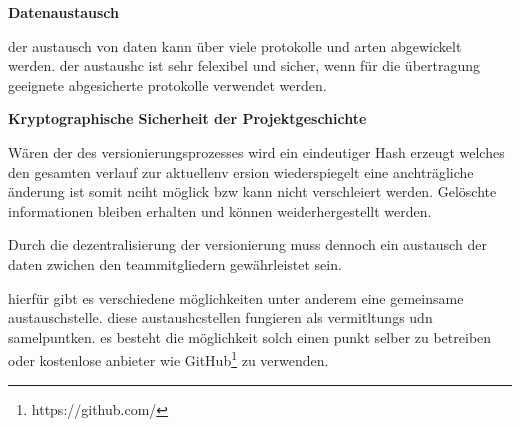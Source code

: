 \textbf{Datenaustausch}

der austausch von daten kann über viele protokolle und arten abgewickelt werden. der austaushc ist sehr felexibel und sicher, wenn für die übertragung geeignete abgesicherte protokolle verwendet werden.


\textbf{Kryptographische Sicherheit der Projektgeschichte}

Wären der des versionierungsprozesses wird ein eindeutiger Hash erzeugt welches den gesamten verlauf zur aktuellenv ersion wiederspiegelt eine anchträgliche änderung ist somit nciht möglick bzw kann nicht verschleiert werden. Gelöschte informationen bleiben erhalten und können weiderhergestellt werden.

Durch die dezentralisierung der versionierung muss dennoch ein austausch der daten zwichen den teammitgliedern gewährleistet sein.

hierfür gibt es verschiedene möglichkeiten unter anderem eine gemeinsame austauschstelle. diese austaushcstellen fungieren als vermitltungs udn samelpuntken. es besteht die möglichkeit solch einen punkt selber zu betreiben oder kostenlose anbieter wie GitHub\footnote{https://github.com/} zu verwenden.

